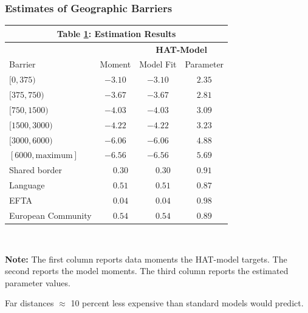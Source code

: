 \documentclass[9pt,pdftex,aspectratio=1610]{beamer}
\theoremstyle{definition}
\begin{document}

\begin{frame}[t]
\frametitle{Estimates of Geographic Barriers}
\begin{table}[t]
\small
\begin{center}
\setlength {\tabcolsep}{5.5mm}
\renewcommand{\arraystretch}{1.10}\label{tb-grav-est}
\begin{tabular}[t]{l c c c}
\multicolumn{4}{c}{{\normalsize\textbf{Table \ref{tb-grav-est}: Estimation Results}} }
\\\hline \hline
& & \multicolumn{2}{c}{\textbf{HAT-Model}}  \\
\cmidrule(lr){3-4}
Barrier& Moment & Model Fit & Parameter \\
\hline $[0,375)$                &$-3.10 $           & $-3.10 $              & $2.35$           \\
$[375,750)$                     &$-3.67 $           & $-3.67 $              & $2.81$           \\
$[750,1500)$                    &$-4.03 $           & $-4.03 $              & $3.09$           \\
$[1500,3000)$                   &$-4.22 $           & $-4.22 $              & $3.23$           \\
$[3000,6000)$                   &$-6.06 $           & $-6.06 $              & $4.88$           \\
$[6000,\mbox{maximum}]$         &$-6.56 $           & $-6.56 $              & $5.69$           \\
Shared border                   &$\phantom{-}0.30$  & $\phantom{-}0.30$     & $0.91$  \\
Language                        &$\phantom{-}0.51$  & $\phantom{-}0.51$     & $0.87$  \\
EFTA                            &$\phantom{-}0.04$  & $\phantom{-}0.04$     & $0.98$  \\
European Community              &$\phantom{-}0.54$  & $\phantom{-}0.54$     & $0.89$  \\
\hline
\end{tabular}
\\[0.5ex]
\parbox{4.2in}{\footnotesize \textbf{Note:} The first column reports data moments the HAT-model targets. The second reports the model moments. The third column reports the estimated parameter values.}
\end{center}
\end{table}
\bigskip
Far distances $\approx$ 10 percent less expensive than standard models would predict.
\end{frame}
\end{document}
